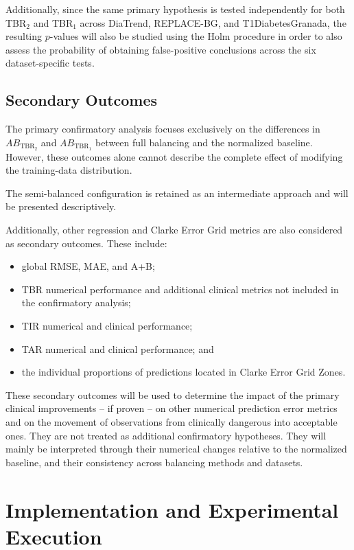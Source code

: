 Additionally, since the same primary hypothesis is tested independently for both TBR$_2$ and TBR$_1$ across DiaTrend, REPLACE-BG, and T1DiabetesGranada, the resulting \(p\)-values will also be studied using the Holm procedure \cite{enwiki:1352765388} in order to also assess the probability of obtaining false-positive conclusions across the six dataset-specific tests.

\subsection{Secondary Outcomes}
\label{subsec:secondary_statistical_outcomes}

The primary confirmatory analysis focuses exclusively on the differences in \(AB_{\mathrm{TBR_2}}\) and \(AB_{\mathrm{TBR_1}}\) between full balancing and the normalized baseline. However, these outcomes alone cannot describe the complete effect of modifying the training-data distribution.

The semi-balanced configuration is retained as an intermediate approach and will be presented descriptively.

Additionally, other regression and Clarke Error Grid metrics are also considered as secondary outcomes. These include:

\begin{itemize}
    \item global RMSE, MAE, and A+B;
    \item TBR numerical performance and additional clinical metrics not included in the confirmatory analysis;
    \item TIR numerical and clinical performance;
    \item TAR numerical and clinical performance; and
    \item the individual proportions of predictions located in Clarke Error Grid Zones.
\end{itemize}

These secondary outcomes will be used to determine the impact of the primary clinical improvements -- if proven -- on other numerical prediction error metrics and on the movement of observations from clinically dangerous into acceptable ones. They are not treated as additional confirmatory hypotheses. They will mainly be interpreted through their numerical changes relative to the normalized baseline, and their consistency across balancing methods and datasets.

\section{Implementation and Experimental Execution}
\label{sec:experimental_execution}

